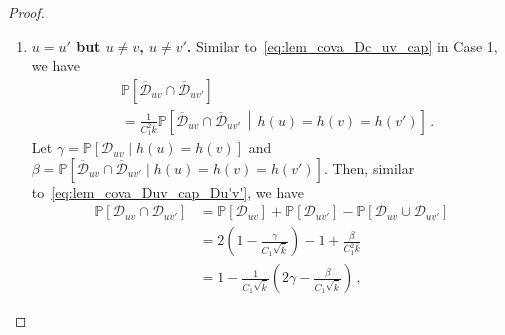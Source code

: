 \documentclass[journal]{IEEEtran}
\theoremstyle{definition}
\theoremstyle{definition}
\newcommand{\Dc}{\mathcal{D}}
\newcommand{\Ec}{\mathcal{E}}
\newcommand{\PP}{\mathbb{P}}
\newcommand{\kb}{\overline{k}}
\newcommand{\bigO}{\mathcal{O}}
\newcommand{\barD}{\overline{\mathcal{D}}}
\begin{document}
\begin{proof}
\begin{enumerate}
\begin{align}
    &\qquad - \exp \left(-\frac{2C_2 \gamma}{C_1} 
       + \bigO \left( \frac{1}{\sqrt{\kb}}\right) \right) \nonumber \\
    &\leq \exp \left(-2C_1 \gamma 
       + \bigO \left(\frac{1}{\sqrt{\kb}}\right) \right) 
       \cdot \left(\exp \left( \frac{\beta}{\sqrt{\kb}}\right) - 1 \right) 
       \nonumber \\
    &\leq \bigO\left( \frac{1}{\sqrt{\kb}} \right), \label{eq:cov_final}
\end{align}
where we used the approximation $1 - x = \exp(-x + \bigO(x^2))$ as $x \to 0$, 
the inequality $\exp(x) \leq 1 + 2x$ for $x \in [0,1]$, the fact that 
$\gamma, \beta \in [0,1]$, and the choice $C_2 = C_1^2$.
        
		
		\item \textbf{$u = u'$ but $u \neq v$, $u \neq v'$.} Similar to~\eqref{eq:lem_cova_Dc_uv_cap} in Case 1, we have
		\begin{align*}
			&\PP[\barD_{uv} \cap \barD_{uv'}] \\
            &= \frac{1}{C_1^2 \kb} \PP\left[ \barD_{uv} \cap \barD_{uv'} \,\middle|\, h(u) = h(v) = h(v') \right] \,.
		\end{align*}
		Let $\gamma = \PP[\Dc_{uv} \mid h(u) = h(v)]$ and $\beta = \PP\left[ \barD_{uv} \cap \barD_{uv'} \mid h(u) = h(v) = h(v') \right]$. Then, similar to~\eqref{eq:lem_cova_Duv_cap_Du'v'}, we have  
        \begin{align*}
    \PP[\Dc_{uv} \cap \Dc_{uv'}] 
    &= \PP[\Dc_{uv}] + \PP[\Dc_{uv'}] - \PP[\Dc_{uv} \cup \Dc_{uv'}] \\
    &= 2 \left(1 - \frac{\gamma}{C_1 \sqrt{\kb}} \right) 
       - 1 + \frac{\beta}{C_1^2 \kb} \\
    &= 1 - \frac{1}{C_1 \sqrt{\kb}} \left( 2\gamma 
       - \frac{\beta}{C_1 \sqrt{\kb}} \right) \,,
    \end{align*}

\end{enumerate}
\end{proof}
\end{document}
